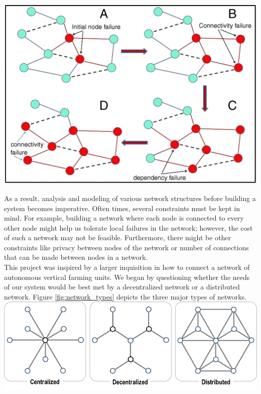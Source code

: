 \documentclass[journal]{IEEEtran}
\begin{document}
\begingroup
    \centering
    \medskip
    \includegraphics[width=\columnwidth]{images/failure.jpg}
    \label{fig:failure}
    \medskip
\endgroup

\noindent As a result, analysis and modeling of various network structures before building a system becomes imperative. Often times, several constraints must be kept in mind. For example, building a network where each node is connected to every other node might help us tolerate local failures in the network; however, the cost of such a network may not be feasible. Furthermore, there might be other constraints like privacy between nodes of the network or number of connections that can be made between nodes in a network.\\

\noindent This project was inspired by a larger inquisition in how to connect a network of autonomous vertical farming units. We began by questioning whether the needs of our system would be best met by a decentralized network or a distributed network. Figure \ref{fig:network_types} depicts the three major types of networks. \\

\begingroup
    \centering
    \medskip
    \includegraphics[width=\columnwidth]{images/network-structures.png}
    \label{fig:network_types}
    \medskip
\endgroup
\end{document}
